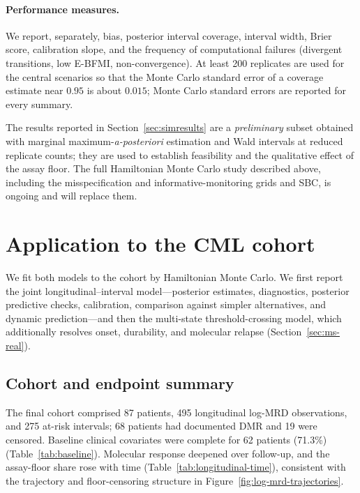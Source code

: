 \documentclass[11pt]{article}
\begin{document}
\paragraph{Performance measures.} We report, separately, bias, posterior
interval coverage, interval width, Brier score, calibration slope, and the
frequency of computational failures (divergent transitions, low E-BFMI,
non-convergence). At least 200 replicates are used for the central scenarios so
that the Monte Carlo standard error of a coverage estimate near $0.95$ is
about $0.015$; Monte Carlo standard errors are reported for every summary.

The results reported in Section~\ref{sec:simresults} are a \emph{preliminary}
subset obtained with marginal maximum-\emph{a-posteriori} estimation and Wald
intervals at reduced replicate counts; they are used to establish feasibility
and the qualitative effect of the assay floor. The full Hamiltonian
Monte Carlo study described above, including the misspecification and
informative-monitoring grids and SBC, is ongoing and will replace them.

\section{Application to the CML cohort}
\label{sec:application}

We fit both models to the cohort by Hamiltonian Monte Carlo. We first report
the joint longitudinal--interval model---posterior estimates, diagnostics,
posterior predictive checks, calibration, comparison against simpler
alternatives, and dynamic prediction---and then the multi-state
threshold-crossing model, which additionally resolves onset, durability, and
molecular relapse (Section~\ref{sec:ms-real}).

\subsection{Cohort and endpoint summary}

The final cohort comprised 87 patients, 495 longitudinal log-MRD
observations, and 275 at-risk intervals; 68 patients had documented DMR
and 19 were censored. Baseline clinical covariates were complete for 62
patients (71.3\%) (Table~\ref{tab:baseline}). Molecular response deepened
over follow-up, and the assay-floor share rose with time
(Table~\ref{tab:longitudinal-time}), consistent with the trajectory and
floor-censoring structure in Figure~\ref{fig:log-mrd-trajectories}.
\end{document}
